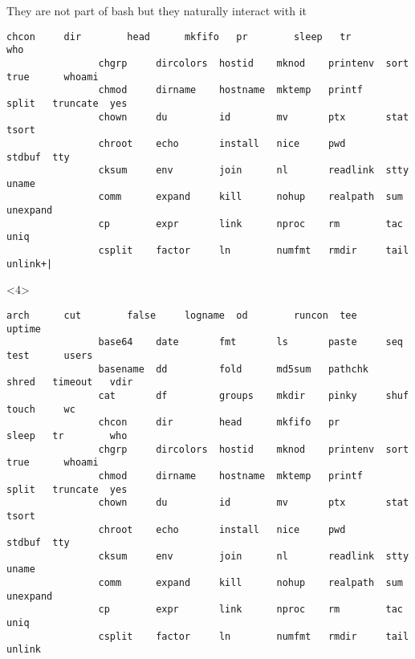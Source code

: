 \begin{frame}[fragile]{They are not part of bash but they naturally interact with it}
\begin{overlayarea}{\textwidth}{0.6\textheight}
\begin{onlyenv}
\begin{lstlisting}[style=myBash, style=smaller, numbers=none, aboveskip=1mm]
                chcon     dir        head      mkfifo   pr        sleep   tr        who
                chgrp     dircolors  hostid    mknod    printenv  sort    true      whoami
                chmod     dirname    hostname  mktemp   printf    split   truncate  yes
                chown     du         id        mv       ptx       stat    tsort
                chroot    echo       install   nice     pwd       stdbuf  tty
                cksum     env        join      nl       readlink  stty    uname
                comm      expand     kill      nohup    realpath  sum     unexpand
                cp        expr       link      nproc    rm        tac     uniq
                csplit    factor     ln        numfmt   rmdir     tail    unlink+|
            \end{lstlisting}
        \end{onlyenv}
        \begin{onlyenv}<4>
            \begin{lstlisting}[style=myBash, style=smaller, numbers=none, aboveskip=1mm, deletekeywords={env, expr, nice, nohup}]
                arch      cut        false     logname  od        runcon  tee       uptime
                base64    date       fmt       ls       paste     seq     test      users
                basename  dd         fold      md5sum   pathchk   shred   timeout   vdir
                cat       df         groups    mkdir    pinky     shuf    touch     wc
                chcon     dir        head      mkfifo   pr        sleep   tr        who
                chgrp     dircolors  hostid    mknod    printenv  sort    true      whoami
                chmod     dirname    hostname  mktemp   printf    split   truncate  yes
                chown     du         id        mv       ptx       stat    tsort
                chroot    echo       install   nice     pwd       stdbuf  tty
                cksum     env        join      nl       readlink  stty    uname
                comm      expand     kill      nohup    realpath  sum     unexpand
                cp        expr       link      nproc    rm        tac     uniq
                csplit    factor     ln        numfmt   rmdir     tail    unlink
            \end{lstlisting}
        \end{onlyenv}
    \end{overlayarea}
\end{frame}
